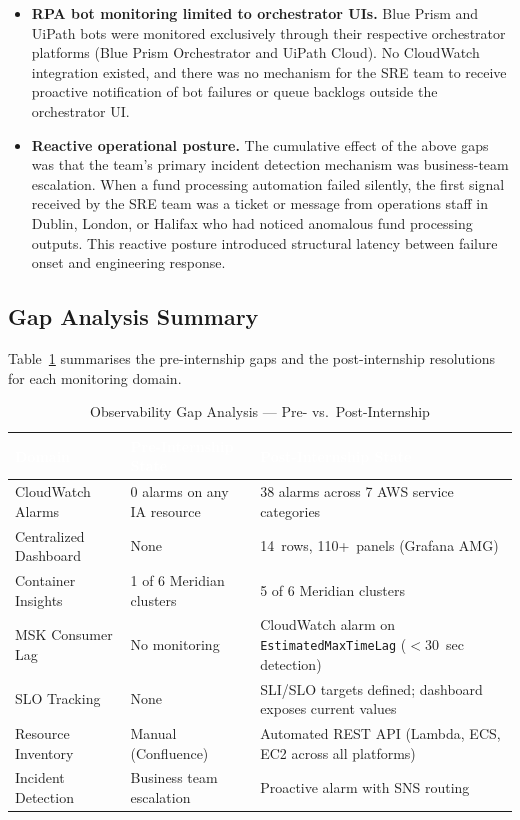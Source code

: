 \begin{itemize}
    \item \textbf{RPA bot monitoring limited to orchestrator UIs.}
          Blue Prism and UiPath bots were monitored exclusively through
          their respective orchestrator platforms (Blue Prism Orchestrator and
          UiPath Cloud). No CloudWatch integration existed, and there
          was no mechanism for the SRE team to receive proactive
          notification of bot failures or queue backlogs outside the
          orchestrator UI.

    \item \textbf{Reactive operational posture.} The cumulative effect
          of the above gaps was that the team's primary incident
          detection mechanism was business-team escalation. When a fund
          processing automation failed silently, the first signal
          received by the SRE team was a ticket or message from
          operations staff in Dublin, London, or Halifax who had noticed
          anomalous fund processing outputs. This reactive posture
          introduced structural latency between failure onset and
          engineering response.
\end{itemize}

\subsection{Gap Analysis Summary}

Table~\ref{tab:gap_analysis} summarises the pre-internship gaps and the
post-internship resolutions for each monitoring domain.

\begin{table}[ht]
\centering
\caption{Observability Gap Analysis --- Pre- vs.\ Post-Internship}
\label{tab:gap_analysis}
\begin{tabularx}{\textwidth}{lXX}
\hline
\rowcolor{smubrand}\textcolor{white}{\textbf{Domain}} & \textcolor{white}{\textbf{Pre-Internship State}} & \textcolor{white}{\textbf{Post-Internship State}} \\
\hline
CloudWatch Alarms & 0 alarms on any IA resource & 38 alarms across 7 AWS service categories \\
Centralized Dashboard & None & 14~rows, 110+~panels (Grafana AMG) \\
Container Insights & 1 of 6 Meridian clusters & 5 of 6 Meridian clusters \\
MSK Consumer Lag & No monitoring & CloudWatch alarm on \texttt{EstimatedMaxTimeLag} ($<$30~sec detection) \\
SLO Tracking & None & SLI/SLO targets defined; dashboard exposes current values \\
Resource Inventory & Manual (Confluence) & Automated REST API (Lambda, ECS, EC2 across all platforms) \\
Incident Detection & Business team escalation & Proactive alarm with SNS routing \\
\hline
\end{tabularx}
\end{table}

